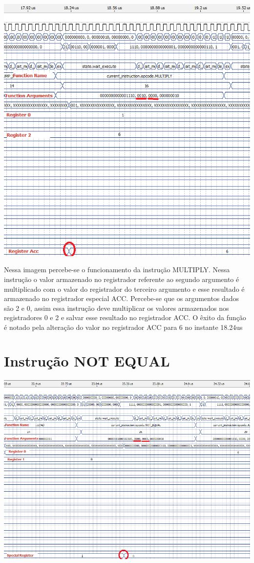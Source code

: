 \documentclass[11pt]{report}
\begin{document}
\includegraphics[width=\textwidth]{multiply}

Nessa imagem percebe-se o funcionamento da instrução MULTIPLY. Nessa instrução o valor armazenado no registrador referente ao segundo argumento é multiplicado com o valor do registrador do terceiro argumento e esse resultado é armazenado no registrador especial ACC. 
Percebe-se que os argumentos dados são 2 e 0, assim essa instrução deve multiplicar os valores armazenados nos registradores 0 e 2 e salvar esse resultado no registrador ACC. O êxito da função é notado pela alteração do valor no registrador ACC para 6 no instante 18.24us

\section{Instrução NOT EQUAL}

\includegraphics[width=\textwidth]{not_equal}
\end{document}
